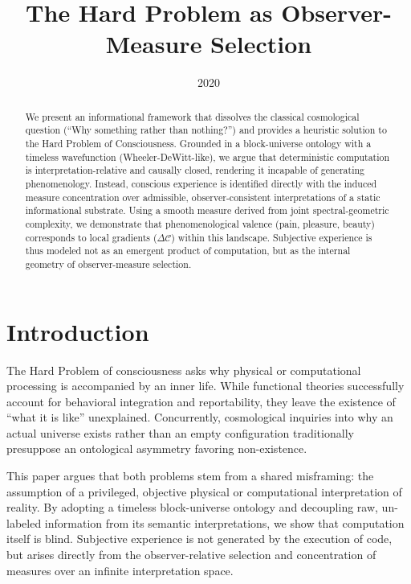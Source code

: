 \documentclass[11pt]{article}
\title{The Hard Problem as Observer-Measure Selection}
\date{2020}
\begin{document}
\maketitle

\begin{abstract}
We present an informational framework that dissolves the classical cosmological question (``Why something rather than nothing?'') and provides a heuristic solution to the Hard Problem of Consciousness. Grounded in a block-universe ontology with a timeless wavefunction (Wheeler-DeWitt-like), we argue that deterministic computation is interpretation-relative and causally closed, rendering it incapable of generating phenomenology. Instead, conscious experience is identified directly with the induced measure concentration over admissible, observer-consistent interpretations of a static informational substrate. Using a smooth measure derived from joint spectral-geometric complexity, we demonstrate that phenomenological valence (pain, pleasure, beauty) corresponds to local gradients ($\Delta \mathcal{C}$) within this landscape. Subjective experience is thus modeled not as an emergent product of computation, but as the internal geometry of observer-measure selection.
\end{abstract}

\section{Introduction}
The Hard Problem of consciousness \cite{chalmers1995facing} asks why physical or computational processing is accompanied by an inner life. While functional theories successfully account for behavioral integration and reportability, they leave the existence of ``what it is like'' unexplained. Concurrently, cosmological inquiries into why an actual universe exists rather than an empty configuration traditionally presuppose an ontological asymmetry favoring non-existence.

This paper argues that both problems stem from a shared misframing: the assumption of a privileged, objective physical or computational interpretation of reality. By adopting a timeless block-universe ontology and decoupling raw, un-labeled information from its semantic interpretations, we show that computation itself is blind. Subjective experience is not generated by the execution of code, but arises directly from the observer-relative selection and concentration of measures over an infinite interpretation space.
\end{document}
